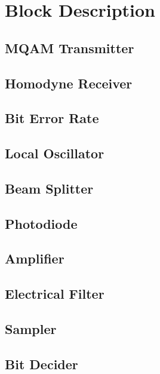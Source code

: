 \documentclass[a4paper]{article}
\begin{document}
\section{Block Description}

\subsection{MQAM Transmitter}

\subsection{Homodyne Receiver}



\subsection{Bit Error Rate}


\subsection{Local Oscillator}


\subsection{Beam Splitter}


\subsection{Photodiode}


\subsection{Amplifier}


\subsection{Electrical Filter}


\subsection{Sampler}


\subsection{Bit Decider}

\end{document}
